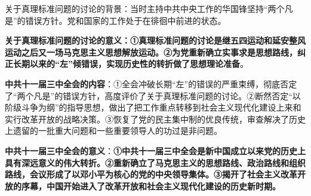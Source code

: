 {
关于真理标准问题的讨论的背景：当时主持中共中央工作的华国锋坚持``两个凡是''的错误方针。党和国家的工作处于在徘徊中前进的状态。}

{\textbf{{关于真理标准问题的讨论的意义：}{①}{真理标准问题的讨论是继五四运动和延安整风运动之后又一场马克思主义思想解放运动。}{②}{为党重新确立实事求是思想路线，纠正长期以来的}{``}{左}{''}{倾错误，实现历史性的转折做了思想理论准备}}{。}}

{\textbf{{中共十一届三中全会的内容}}{：}{①全会冲破长期``左''的错误的严重束缚，彻底否定了``两个凡是''的错误方针，高度评价了关于真理标准问题的讨论。②断然否定``以阶级斗争为纲''的指导思想，做出了把工作重点转移到社会主义现代化建设上来和实行改革开放的战略决策。③恢复了党的民主集中制的优良传统，审查解决了历史上遗留的一批重大问题和一些重要领导人的功过是非问题}{。}}

{\textbf{{中共十一届三中全会的意义}}{：}\textbf{{①中共十一届三中全会是新中国成立以来党的历史上具有深远意义的伟大转折。②重新确立了马克思主义的思想路线、政治路线和组织路线，会议形成了以邓小平为核心的党的中央领导集体。③揭开了社会主义改革开放的序幕，中国开始进入了改革开放和社会主义现代化建设的历史新时期。}}}
